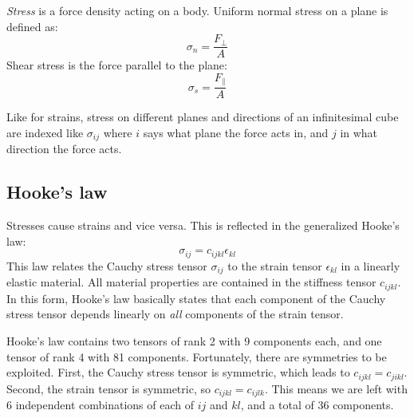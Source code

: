\emph{Stress} is a force density acting on a body. Uniform normal stress on a plane is defined as:
\begin{equation}
	\sigma_n = \frac{F_\perp}{A}
\end{equation}
Shear stress is the force parallel to the plane:
\begin{equation}
	\sigma_s = \frac{F_\parallel}{A}
\end{equation}

Like for strains, stress on different planes and directions of an infinitesimal cube are indexed like $\sigma_{ij}$ where $i$ says what plane the force acts in, and $j$ in what direction the force acts.

\subsection{Hooke's law}
Stresses cause strains and vice versa. This is reflected in the generalized Hooke's law:
\begin{equation}
	\sigma_{ij} = c_{ijkl}\epsilon_{kl}
\end{equation}
This law relates the Cauchy stress tensor $\sigma_{ij}$ to the strain tensor $\epsilon_{kl}$ in a linearly elastic material. All material properties are contained in the stiffness tensor $c_{ijkl}$.
In this form, Hooke's law basically states that each component of the Cauchy stress tensor depends linearly on \emph{all} components of the strain tensor. 

Hooke's law contains two tensors of rank 2 with 9 components each, and one tensor of rank 4 with 81 components. Fortunately, there are symmetries to be exploited. First, the Cauchy stress tensor is symmetric, which leads to $c_{ijkl} = c_{jikl}$. Second, the strain tensor is symmetric, so $c_{ijkl} = c_{ijlk}$. This means we are left with 6 independent combinations of each of $ij$ and $kl$, and a total of 36 components. 

